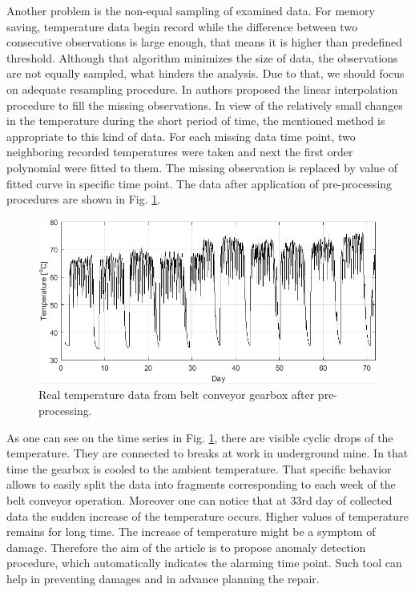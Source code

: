 Another problem is the non-equal sampling of examined data. For memory saving, temperature data begin record while the difference between two consecutive observations is large enough, that means it is higher than predefined threshold. Although that algorithm minimizes the size of data, the observations are not equally sampled, what hinders the analysis. Due to that, we should focus on adequate resampling procedure. In \cite{Wodecki} authors proposed the linear interpolation procedure to fill the missing observations. In view of the relatively small changes in the temperature during the short period of time, the mentioned method is appropriate to this kind of data. For each missing data time point, two neighboring recorded temperatures were taken and next the first order polynomial were fitted to them. The missing observation is replaced by value of fitted curve in specific time point. The data after application of pre-processing procedures are shown in Fig. \ref{fig: L222_55_data}.
\begin{figure}[ht!]
\vspace{-10pt}
\centering
\includegraphics[width = 1\textwidth]{Wykresy/L222_55_data.png}
\caption{Real temperature data from belt conveyor gearbox after pre-processing.}
\label{fig: L222_55_data}
\vspace{-10pt}
\end{figure}
As one can see on the time series in Fig. \ref{fig: L222_55_data}, there are visible cyclic drops of the temperature. They are connected to breaks at work in underground mine. In that time the gearbox is cooled to the ambient temperature. That specific behavior allows to easily split the data into fragments corresponding to each week of the belt conveyor operation. Moreover one can notice that at $33$rd day of collected data the sudden increase of the temperature occurs. Higher values of temperature remains for long time. The increase of temperature might be a symptom of damage. Therefore the aim of the article is to propose anomaly detection procedure, which automatically indicates the alarming time point. Such tool can help in preventing damages and in advance planning the repair.
